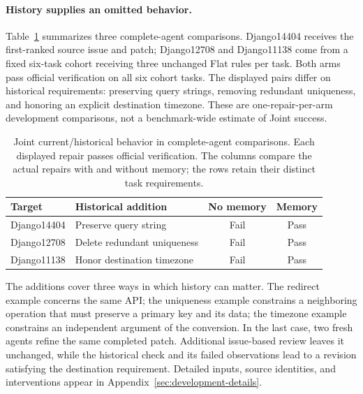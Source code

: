 \paragraph{History supplies an omitted behavior.}
Table~\ref{tab:historicalrequirements} summarizes three complete-agent comparisons.
Django14404 receives the first-ranked source issue and patch; Django12708 and
Django11138 come from a fixed six-task cohort receiving three unchanged Flat
rules per task. Both arms pass official verification on all six cohort tasks.
The displayed pairs differ on historical requirements: preserving query strings,
removing redundant uniqueness, and honoring an explicit destination timezone.
These are one-repair-per-arm development comparisons, not a benchmark-wide
estimate of Joint success.

\begin{table}[!htbp]
\centering
\caption{Joint current/historical behavior in complete-agent comparisons.
Each displayed repair passes official verification. The columns compare the actual repairs with and without memory; the rows retain their distinct task requirements.}
\label{tab:historicalrequirements}
\begin{tabular}{llcc}
\toprule
Target & Historical addition & No memory & Memory \\
\midrule
Django14404 & Preserve query string & Fail & Pass \\
Django12708 & Delete redundant uniqueness & Fail & Pass \\
Django11138 & Honor destination timezone & Fail & Pass \\
\bottomrule
\end{tabular}
\end{table}

The additions cover three ways in which history can matter. The redirect
example concerns the same API; the uniqueness example constrains a neighboring
operation that must preserve a primary key and its data; the timezone example
constrains an independent argument of the conversion. In the last case, two
fresh agents refine the same completed patch. Additional issue-based review
leaves it unchanged, while the historical check and its failed observations
lead to a revision satisfying the destination requirement. Detailed inputs,
source identities, and interventions appear in Appendix~\ref{sec:development-details}.

